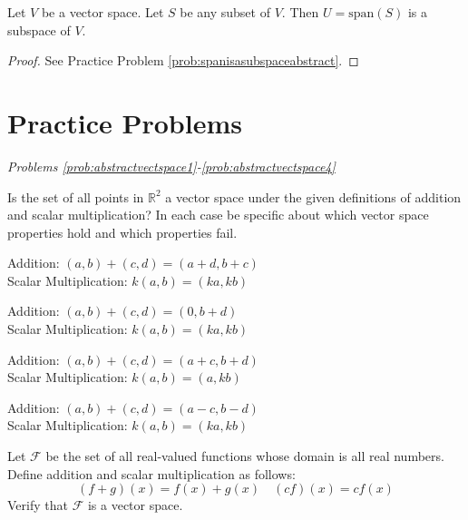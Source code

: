 \documentclass{ximera}
\begin{document}
\begin{theorem}\label{th:spanisasubspaceabstract}
Let $V$ be a vector space.  Let $S$ be any subset of $V$.  Then $U=\mbox{span}(S)$ is a subspace of $V$.
\end{theorem}
\begin{proof}
See Practice Problem \ref{prob:spanisasubspaceabstract}.
\end{proof}

\section*{Practice Problems}
\emph{Problems \ref{prob:abstractvectspace1}-\ref{prob:abstractvectspace4}}

Is the set of all points in $\mathbb{R}^2$ a vector space under the given definitions of addition and scalar multiplication?    In each case be specific about which vector space properties hold and which properties fail.

  \begin{problem}\label{prob:abstractvectspace1}
  Addition: $(a, b)+(c, d)=(a+d, b+c)$\\ Scalar Multiplication: $k(a, b)=(ka, kb)$
  \end{problem}
  
  \begin{problem}\label{prob:abstractvectspace2}
  Addition: $(a, b)+(c, d)=(0, b+d)$\\ Scalar Multiplication: $k(a, b)=(ka, kb)$
  \end{problem}
  
  \begin{problem}\label{prob:abstractvectspace3}
  Addition: $(a, b)+(c, d)=(a+c, b+d)$\\ Scalar Multiplication: $k(a, b)=(a, kb)$
  \end{problem}
  
  \begin{problem}\label{prob:abstractvectspace4}
  Addition: $(a, b)+(c, d)=(a-c, b-d)$\\ Scalar Multiplication: $k(a, b)=(ka, kb)$
  \end{problem}
 
   
 \begin{problem}\label{prob:abstractvectspace5}
 Let $\mathcal{F}$ be the set of all real-valued functions whose domain is all real numbers.  Define addition and scalar multiplication as follows:
 $$(f+g)(x)=f(x)+g(x)\quad (cf)(x)=cf(x)$$
 Verify that $\mathcal{F}$ is a vector space.
 \end{problem}
 
\end{document}
